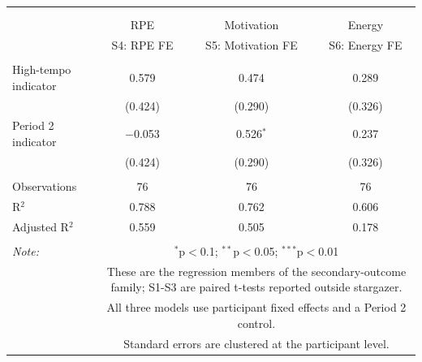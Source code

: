 
\begingroup 
\scriptsize 
\begin{tabular}{@{\extracolsep{3pt}}lccc} 
\\[-1.8ex]\hline 
\hline \\[-1.8ex] 
\\[-1.8ex] & RPE & Motivation & Energy \\ 
 & S4: RPE FE & S5: Motivation FE & S6: Energy FE \\ 
\hline \\[-1.8ex] 
 High-tempo indicator & 0.579 & 0.474 & 0.289 \\ 
  & (0.424) & (0.290) & (0.326) \\ 
  Period 2 indicator & $-$0.053 & 0.526$^{*}$ & 0.237 \\ 
  & (0.424) & (0.290) & (0.326) \\ 
 \hline \\[-1.8ex] 
Observations & 76 & 76 & 76 \\ 
R$^{2}$ & 0.788 & 0.762 & 0.606 \\ 
Adjusted R$^{2}$ & 0.559 & 0.505 & 0.178 \\ 
\hline 
\hline \\[-1.8ex] 
\textit{Note:}  & \multicolumn{3}{p{0.82\textwidth}}{$^{*}$p$<$0.1; $^{**}$p$<$0.05; $^{***}$p$<$0.01} \\ 
 & \multicolumn{3}{p{0.82\textwidth}}{These are the regression members of the secondary-outcome family; S1-S3 are paired t-tests reported outside stargazer.} \\ 
 & \multicolumn{3}{p{0.82\textwidth}}{All three models use participant fixed effects and a Period 2 control.} \\ 
 & \multicolumn{3}{p{0.82\textwidth}}{Standard errors are clustered at the participant level.} \\ 
\end{tabular} 
\endgroup 
